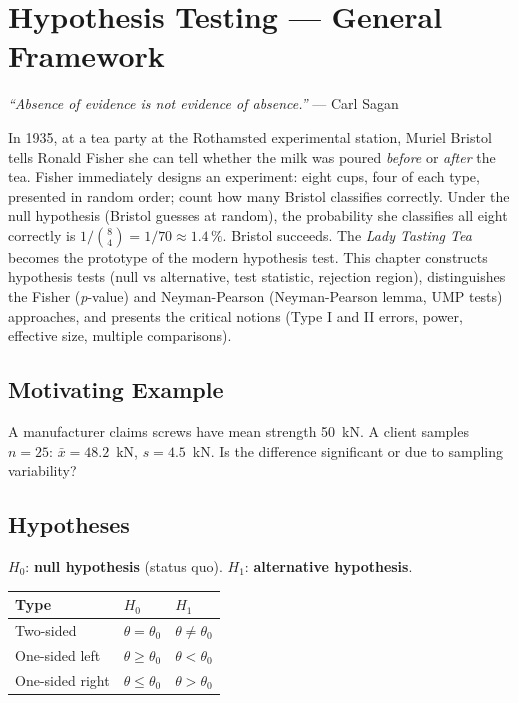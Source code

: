 \chapter{Hypothesis Testing --- General Framework}
\label{ch:tests}

\begin{center}
\textit{``Absence of evidence is not evidence of absence.''} --- Carl Sagan
\end{center}

In 1935, at a tea party at the Rothamsted experimental station, Muriel Bristol tells Ronald Fisher she can tell whether the milk was poured \emph{before} or \emph{after} the tea. Fisher immediately designs an experiment: eight cups, four of each type, presented in random order; count how many Bristol classifies correctly. Under the null hypothesis (Bristol guesses at random), the probability she classifies all eight correctly is $1/\binom{8}{4} = 1/70 \approx 1.4\,\%$. Bristol succeeds. The \emph{Lady Tasting Tea} becomes the prototype of the modern hypothesis test. This chapter constructs hypothesis tests (null vs alternative, test statistic, rejection region), distinguishes the Fisher (\emph{p}-value) and Neyman-Pearson (Neyman-Pearson lemma, UMP tests) approaches, and presents the critical notions (Type I and II errors, power, effective size, multiple comparisons).

\section{Motivating Example}

A manufacturer claims screws have mean strength 50~kN. A client samples $n=25$: $\bar{x}=48.2$~kN, $s=4.5$~kN. Is the difference significant or due to sampling variability?

\section{Hypotheses}

\begin{definition}
$H_0$: \textbf{null hypothesis} (status quo). $H_1$: \textbf{alternative hypothesis}.

\begin{center}
\begin{tabular}{lll}
\toprule
\textbf{Type} & $H_0$ & $H_1$ \\
\midrule
Two-sided & $\theta=\theta_0$ & $\theta\neq\theta_0$ \\
One-sided left & $\theta\geq\theta_0$ & $\theta<\theta_0$ \\
One-sided right & $\theta\leq\theta_0$ & $\theta>\theta_0$ \\
\bottomrule
\end{tabular}
\end{center}
\end{definition}

